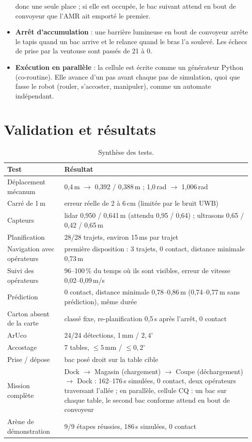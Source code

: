 \documentclass[11pt,a4paper]{article}
\begin{document}
\begin{itemize}
        donc une seule place ; si elle est occupée, le bac suivant attend en bout de convoyeur que
        l'AMR ait emporté le premier.
  \item \textbf{Arrêt d'accumulation} : une barrière lumineuse en bout de convoyeur arrête le tapis
        quand un bac arrive et le relance quand le bras l'a soulevé. Les échecs de prise par la
        ventouse sont passés de 21 à 0.
  \item \textbf{Exécution en parallèle} : la cellule est écrite comme un générateur Python
        (co-routine). Elle avance d'un pas avant chaque pas de simulation, quoi que fasse le robot
        (rouler, s'accoster, manipuler), comme un automate indépendant.
\end{itemize}

\section{Validation et résultats}

\begin{table}[h]
\centering\small
\begin{tabularx}{\linewidth}{@{}lL@{}}
\toprule
\textbf{Test} & \textbf{Résultat} \\
\midrule
Déplacement mécanum & 0,4\,m $\rightarrow$ 0,392 / 0,388\,m ; 1,0\,rad $\rightarrow$ 1,006\,rad \\
Carré de 1\,m & erreur réelle de 2 à 6\,cm (limitée par le bruit UWB) \\
Capteurs & lidar 0,950 / 0,641\,m (attendu 0,95 / 0,64) ; ultrasons 0,65 / 0,42 / 0,65\,m \\
Planification & 28/28 trajets, environ 15\,ms par trajet \\
Navigation avec opérateurs & première disposition : 3 trajets, 0 contact, distance minimale 0,73\,m \\
Suivi des opérateurs & 96--100\,\% du temps où ils sont visibles, erreur de vitesse 0,02--0,09\,m/s \\
Prédiction & 0 contact, distance minimale 0,78--0,86\,m (0,74--0,77\,m sans prédiction), même durée \\
Carton absent de la carte & classé fixe, re-planification 0,5\,s après l'arrêt, 0 contact \\
ArUco & 24/24 détections, 1\,mm / $2{,}4^\circ$ \\
Accostage & 7 tables, $\leq 5$\,mm / $\leq 0{,}2^\circ$ \\
Prise / dépose & bac posé droit sur la table cible \\
Mission complète & Dock $\rightarrow$ Magasin (chargement) $\rightarrow$ Coupe (déchargement)
  $\rightarrow$ Dock : 162--176\,s simulées, 0 contact, deux opérateurs traversant l'allée ; en
  parallèle, cellule CQ : un bac sur chaque table, le second bac conforme attend en bout de
  convoyeur \\
Arène de démonstration & 9/9 étapes réussies, 186\,s simulées, 0 contact \\
\bottomrule
\end{tabularx}
\caption{Synthèse des tests.}
\end{table}
\end{document}
